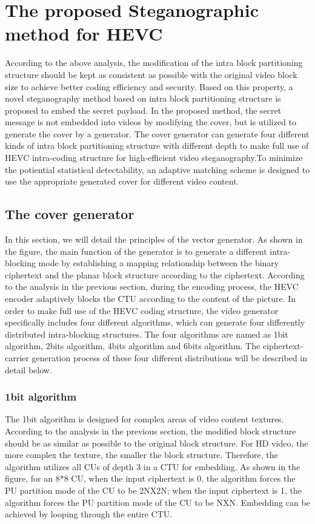 \documentclass[journal,sort]{IEEEtran}
\begin{document}
\section{The proposed Steganographic method for HEVC}
According to the above analysis, the modification of the intra block partitioning structure should be kept as consistent as possible with the original video block size to achieve better coding efficiency and security. Based on this property, a novel steganography method based on intra block partitioning structure is proposed to embed the secret payload. In the proposed method, the secret message is not embedded into videos by modifying the cover, but is utilized to generate the cover by a generator. The cover generator can generate four different kinds of intra block partitioning structure with different depth to make full use of HEVC intra-coding structure for high-efficient video steganography.To minimize the potiential statistical detectability, an adaptive matching scheme is designed to use the appropriate generated cover for different video content.
\subsection{The cover generator}
In this section, we will detail the principles of the vector generator. As shown in the figure, the main function of the generator is to generate a different intra-blocking mode by establishing a mapping relationship between the binary ciphertext and the planar block structure according to the ciphertext. According to the analysis in the previous section, during the encoding process, the HEVC encoder adaptively blocks the CTU according to the content of the picture. In order to make full use of the HEVC coding structure, the video generator specifically includes four different algorithms, which can generate four differently distributed intra-blocking structures. The four algorithms are named as 1bit algorithm, 2bits algorithm, 4bits algorithm and 6bits algorithm. The ciphertext-carrier generation process of these four different distributions will be described in detail below.
\subsubsection{1bit algorithm}
The 1bit algorithm is designed for complex areas of video content textures. According to the analysis in the previous section, the modified block structure should be as similar as possible to the original block structure. For HD video, the more complex the texture, the smaller the block structure. Therefore, the algorithm utilizes all CUs of depth 3 in a CTU for embedding. As shown in the figure, for an 8*8 CU, when the input ciphertext is 0, the algorithm forces the PU partition mode of the CU to be 2NX2N; when the input ciphertext is 1, the algorithm forces the PU partition mode of the CU to be NXN. Embedding can be achieved by looping through the entire CTU.
\end{document}
